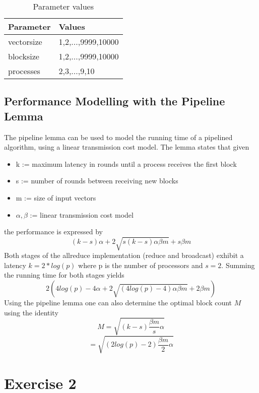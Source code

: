 \documentclass[twoside,twocolumn,hidelinks]{article}
\begin{document}
\begin{table}[h]
      \centering
      \begin{tabular}{ll}
            \toprule
            Parameter & Values \\
            \midrule
            vectorsize   & 1,2,...,9999,10000 \\
            blocksize    & 1,2,...,9999,10000  \\
            processes    & 2,3,...,9,10  \\
            \bottomrule
      \end{tabular}
      \caption{Parameter values}
\end{table}

\subsection{Performance Modelling with the Pipeline Lemma}
The pipeline lemma can be used to model the running time of a pipelined algorithm, using a linear transmission cost model. The lemma states that given
\begin{itemize}
      \item k := maximum latency in rounds until a process receives the first block
      \item s := number of rounds between receiving new blocks
      \item m := size of input vectors
      \item $\alpha,\beta$ := linear transmission cost model
\end{itemize}
the performance is expressed by
\begin{equation}
      (k-s)\alpha + 2\sqrt{s(k-s)\alpha\beta m} + s\beta m
\end{equation}
Both stages of the allreduce implementation (reduce and broadcast) exhibit a latency $k=2*log(p)$ where p is the number of processors and $s=2$. Summing the running time for both stages yields
\begin{equation}
      2(4log(p)-4\alpha + 2\sqrt{(4log(p)-4)\alpha\beta m} + 2\beta m)
\end{equation}
Using the pipeline lemma one can also determine the optimal block count $M$ using the identity 
\begin{equation}
      M = \sqrt{(k-s)\frac{\beta m}{s}\alpha}
\end{equation}
\begin{equation}
      = \sqrt{(2log(p)-2)\frac{\beta m}{2}\alpha}
\end{equation}

\section{Exercise 2}

\printbibliography

\end{document}
